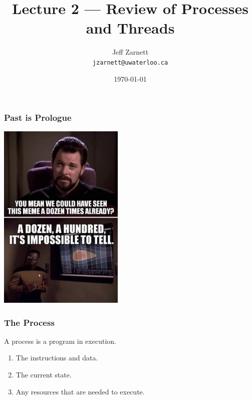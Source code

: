 

\title{Lecture 2 --- Review of Processes and Threads }

\author{Jeff Zarnett \\ \small \texttt{jzarnett@uwaterloo.ca}}
\date{\today}




\begin{frame}
  \titlepage

 \end{frame}

\begin{frame}
\frametitle{Past is Prologue}


\begin{center}
	\includegraphics[width=0.45\textwidth]{images/memeloop.jpg}
\end{center}


\end{frame}

\begin{frame}
	\frametitle{The Process}

	A process is a program in execution.

	\begin{enumerate}
		\item The instructions and data.
		\item The current state.
		\item Any resources that are needed to execute.
	\end{enumerate}

\end{frame}


